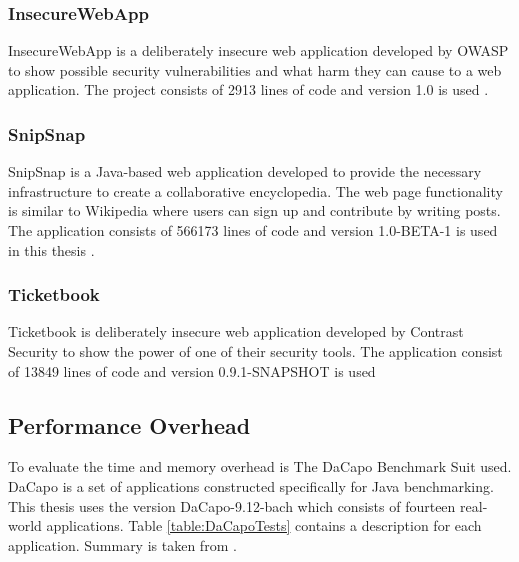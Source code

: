 \subsubsection{InsecureWebApp}
InsecureWebApp is a deliberately insecure web application developed by OWASP to show possible security vulnerabilities and what harm they can cause to a web application. The project consists of 2913 lines of code and version 1.0 is used \parencite{insecure}. 



\subsubsection{SnipSnap}
SnipSnap is a Java-based web application developed to provide the necessary infrastructure to create a collaborative encyclopedia. The web page functionality is similar to Wikipedia \parencite{wikipedia} where users can sign up and contribute by writing posts. The application consists of 566173 lines of code and version 1.0-BETA-1 is used in this thesis \parencite{snipsnap}. 



\subsubsection{Ticketbook}
Ticketbook is deliberately insecure web application developed by Contrast Security to show the power of one of their security tools. The application consist of 13849 lines of code and version 0.9.1-SNAPSHOT is used \parencite{ticketbook, contrast}



\subsection{Performance Overhead}
To evaluate the time and memory overhead is The DaCapo Benchmark Suit \parencite{dacapo} used. DaCapo is a set of applications constructed specifically for Java benchmarking. This thesis uses the version DaCapo-9.12-bach which consists of fourteen real-world applications. Table \ref{table:DaCapoTests} contains a description for each application. Summary is taken from \textcite{dacapoBench}.

